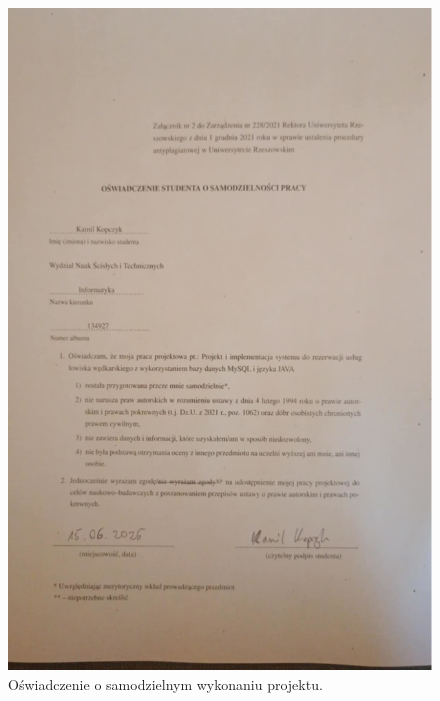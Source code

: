 \chapter*{}
\label{cha:statement-A}


\begin{figure}[H]
    \centering
    \includegraphics[width=0.8\linewidth]{figures/oswiadczenie.eps}
    \caption{Oświadczenie o samodzielnym wykonaniu projektu.}
    \label{fig:statementA}
\end{figure}
\clearpage